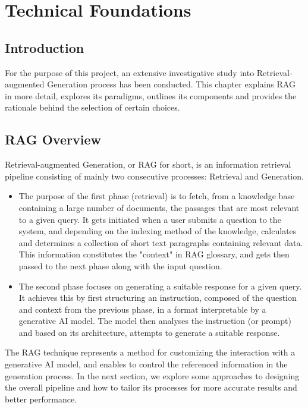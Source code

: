 \chapter{Technical Foundations}

\section{Introduction}
For the purpose of this project, an extensive investigative study into Retrieval-augmented Generation process has been conducted. This chapter explains RAG in more detail, explores its paradigms, outlines its components and provides the rationale behind the selection of certain choices.

\section{RAG Overview}
Retrieval-augmented Generation, or RAG for short, is an information retrieval pipeline consisting of mainly two consecutive processes: Retrieval and Generation.
\begin{itemize}
    \item The purpose of the first phase (retrieval) is to fetch, from a knowledge base containing a large number of documents, the passages that are most relevant to a given query. It gets initiated when a user submits a question to the system, and depending on the indexing method of the knowledge, calculates and determines a collection of short text paragraphs containing relevant data. This information constitutes the "context" in RAG glossary, and gets then passed to the next phase along with the input question.
    \item The second phase focuses on generating a suitable response for a given query. It achieves this by first structuring an instruction, composed of the question and context from the previous phase, in a format interpretable by a generative AI model. The model then analyses the instruction (or prompt) and based on its architecture, attempts to generate a suitable response.
\end{itemize}
The RAG technique represents a method for customizing the interaction with a generative AI model, and enables to control the referenced information in the generation process. In the next section, we explore some approaches to designing the overall pipeline and how to tailor its processes for more accurate results and better performance.


